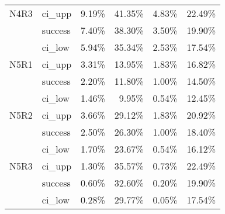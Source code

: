 \begin{tabular}{llrrrr}
N4R3 & ci\_upp &       9.19\% & 41.35\% &        4.83\% & 22.49\% \\
     & success &       7.40\% & 38.30\% &        3.50\% & 19.90\% \\
     & ci\_low &       5.94\% & 35.34\% &        2.53\% & 17.54\% \\
N5R1 & ci\_upp &       3.31\% & 13.95\% &        1.83\% & 16.82\% \\
     & success &       2.20\% & 11.80\% &        1.00\% & 14.50\% \\
     & ci\_low &       1.46\% &  9.95\% &        0.54\% & 12.45\% \\
N5R2 & ci\_upp &       3.66\% & 29.12\% &        1.83\% & 20.92\% \\
     & success &       2.50\% & 26.30\% &        1.00\% & 18.40\% \\
     & ci\_low &       1.70\% & 23.67\% &        0.54\% & 16.12\% \\
N5R3 & ci\_upp &       1.30\% & 35.57\% &        0.73\% & 22.49\% \\
     & success &       0.60\% & 32.60\% &        0.20\% & 19.90\% \\
     & ci\_low &       0.28\% & 29.77\% &        0.05\% & 17.54\% \\
\bottomrule
\end{tabular}


